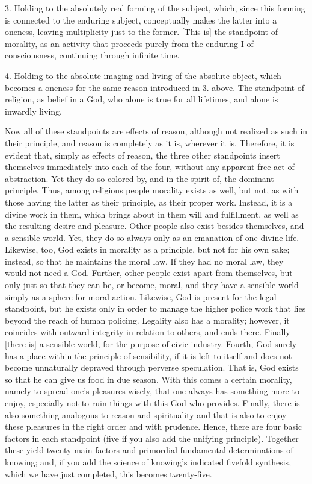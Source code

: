 3. Holding to the absolutely
real forming of the subject,
which, since this forming is
connected to the enduring subject,
conceptually makes the latter into a oneness,
leaving multiplicity just to the former.
[This is] the standpoint of morality,
as an activity that proceeds purely
from the enduring I of consciousness,
continuing through infinite time.

4. Holding to the absolute
imaging and living of the absolute object,
which becomes a oneness
for the same reason introduced in 3. above.
The standpoint of religion,
as belief in a God,
who alone is true for all lifetimes,
and alone is inwardly living.

Now all of these standpoints are effects of reason,
although not realized as such in their principle,
and reason is completely as it is, wherever it is.
Therefore, it is evident that, simply as effects of reason,
the three other standpoints insert themselves
immediately into each of the four,
without any apparent free act of abstraction.
Yet they do so colored by,
and in the spirit of,
the dominant principle.
Thus, among religious people morality exists as well,
but not, as with those having the latter as their principle,
as their proper work.
Instead, it is a divine work in them,
which brings about in them will and fulfillment,
as well as the resulting desire and pleasure.
Other people also exist besides themselves, and a sensible world.
Yet, they do so always only as an emanation of one divine life.
Likewise, too, God exists in morality as a principle,
but not for his own sake;
instead, so that he maintains the moral law.
If they had no moral law, they would not need a God.
Further, other people exist apart from themselves,
but only just so that they can be, or become, moral,
and they have a sensible world simply as a sphere for moral action.
Likewise, God is present for the legal standpoint,
but he exists only in order to manage the
higher police work that lies beyond the reach of human policing.
Legality also has a morality;
however, it coincides with outward integrity
in relation to others, and ends there.
Finally [there is] a sensible world,
for the purpose of civic industry.
Fourth, God surely has a place within the principle of sensibility,
if it is left to itself and does not become
unnaturally depraved through perverse speculation.
That is, God exists so that he can give us food in due season.
With this comes a certain morality,
namely to spread one’s pleasures wisely,
that one always has something more to enjoy,
especially not to ruin things
with this God who provides.
Finally, there is also something analogous
to reason and spirituality
and that is also to enjoy these pleasures
in the right order and with prudence.
Hence, there are four basic factors in each standpoint
(five if you also add the unifying principle).
Together these yield twenty main factors
and primordial fundamental determinations of knowing;
and, if you add the science of knowing’s
indicated fivefold synthesis,
which we have just completed,
this becomes twenty-five.

